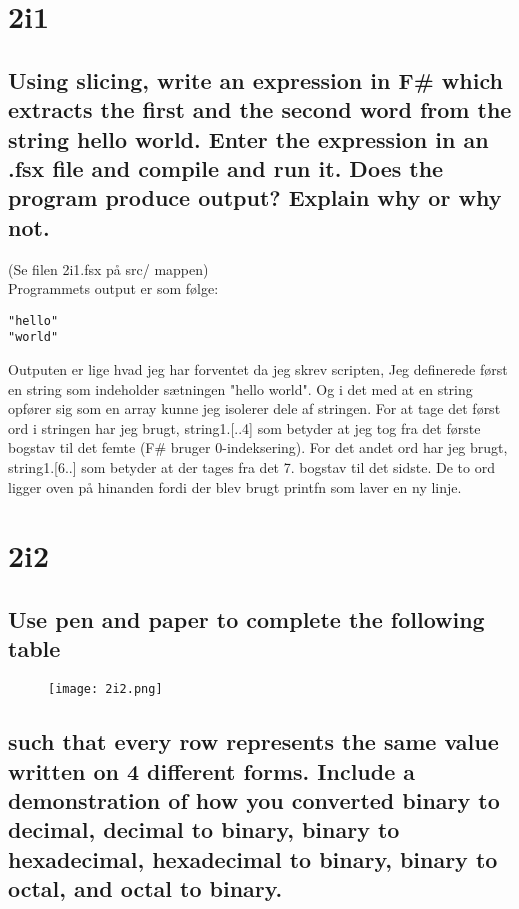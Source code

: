 \documentclass{article}
\begin{document}
\section*{2i1}
\subsection*{Using slicing, write an expression in F\# which extracts the first and the second word from the string hello world. Enter the expression in an .fsx file and compile and run it. Does the program produce output? Explain why or why not.}
(Se filen 2i1.fsx på src/ mappen)
\\
Programmets output er som følge:
\begin{verbatim}
"hello"
"world"
\end{verbatim}
Outputen er lige hvad jeg har forventet da jeg skrev scripten, Jeg definerede først en string som indeholder sætningen "hello world". Og i det med at en string opfører sig som en array kunne jeg isolerer dele af stringen. For at tage det først ord i stringen har jeg brugt, string1.[..4] som betyder at jeg tog fra det første bogstav til det femte (F\# bruger 0-indeksering). For det andet ord har jeg brugt, string1.[6..] som betyder at der tages fra det 7. bogstav til det sidste. De to ord ligger oven på hinanden fordi der blev brugt printfn som laver en ny linje.


\newpage
\section*{2i2} 
\subsection*{Use pen and paper to complete the following table}

\begin{figure}[h!]
\begin{center}
\texttt{[image: 2i2.png]}
\end{center}
\end{figure}

\subsection*{such that every row represents the same value written on 4 different forms. Include a demonstration of how you converted binary to decimal, decimal to binary, binary to hexadecimal, hexadecimal to binary, binary to octal, and octal to binary.}
\end{document}
